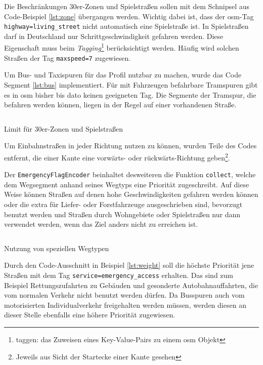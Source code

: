 Die Beschränkungen 30er-Zonen und Spielstraßen sollen mit dem Schnipsel aus Code-Beispiel \ref{lst:zone} übergangen werden.
Wichtig dabei ist, dass der \gls{osm}-Tag \texttt{highway=living\_street} nicht automatisch eine Spielstraße ist.
In Spielstraßen darf in Deutschland nur Schrittgeschwindigkeit gefahren werden.
Diese Eigenschaft muss beim \textit{Tagging}\footnote{taggen: das Zuweisen eines Key-Value-Pairs zu einem \gls{osm} Objekt} berücksichtigt werden.
Häufig wird solchen Straßen der Tag \texttt{maxspeed=7} zugewiesen.


Um Bus- und Taxispuren für das Profil nutzbar zu machen, wurde das Code Segment \ref{lst:bus} implementiert.
Für mit Fahrzeugen befahrbare Tramspuren gibt es in \gls{osm} bisher bis dato keinen geeigneten Tag.
Die Segmente der Tramspur, die befahren werden können, liegen in der Regel auf einer vorhandenen Straße.
\begin{listing}[htb]
\centering
{}
\inputminted[gobble=2, fontsize=\footnotesize, breaklines=true, breakbytoken=|, firstline=299, lastline=303]{java}{../data/JavaFiles/EmergencyFlagEncoder.java}
\caption{Limit für 30er-Zonen und Spielstraßen}
\label{lst:zone}
\end{listing}

Um Einbahnstraßen in jeder Richtung nutzen zu können, wurden Teile des Codes entfernt, die einer Kante eine vorwärts- oder rückwärts-Richtung geben\footnote{Jeweils aus Sicht der Startecke einer Kante gesehen}.

Der \texttt{EmergencyFlagEncoder} beinhaltet desweiteren die Funktion \texttt{collect}, welche dem Wegsegment anhand seines Wegtyps eine Priorität zugeschreibt.
Auf diese Weise können Straßen auf denen hohe Geschwindigkeiten gefahren werden können oder die extra für Liefer- oder Forstfahrzeuge ausgeschrieben sind, bevorzugt benutzt werden und Straßen durch Wohngebiete oder Spielstraßen nur dann verwendet werden, wenn das Ziel anders nicht zu erreichen ist.

\begin{listing}[htb]
\centering
{}
\inputminted[gobble=2, fontsize=\footnotesize, breaklines=true, breakbytoken=|, firstline=403, lastline=417]{java}{../data/JavaFiles/EmergencyFlagEncoder.java}
\caption{Nutzung von speziellen Wegtypen}
\label{lst:bus}
\end{listing}

Durch den Code-Ausschnitt in Beispiel \ref{lst:weight} soll die höchste Priorität jene Straßen mit dem Tag \texttt{service=emergency\_access} erhalten.
Das sind zum Beispiel Rettungszufahrten zu Gebäuden und gesonderte Autobahnauffahrten, die vom normalen Verkehr nicht benutzt werden dürfen.
Da Busspuren auch vom motorisierten Individualverkehr freigehalten werden müssen, werden diesen an dieser Stelle ebenfalls eine höhere Priorität zugewiesen.

